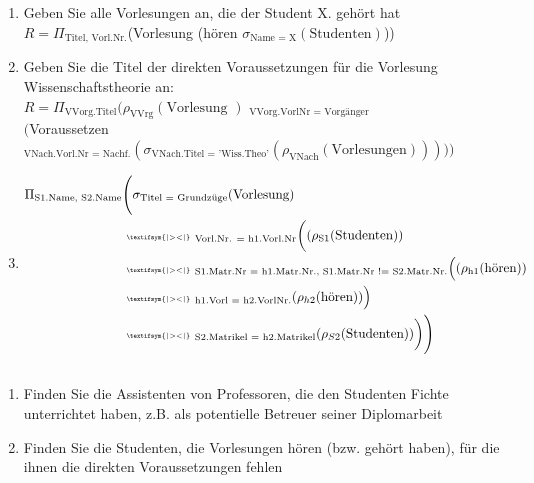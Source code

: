 \subsection{}
\begin{enumerate}
	\item Geben Sie alle Vorlesungen an, die der Student X. gehört hat \\
	 \(R = \Pi_{\text{Titel, Vorl.Nr.}}\)(Vorlesung {\tiny \textifsym{|><|}} (hören {\tiny \textifsym{|><|}} \(\sigma_{\text{Name = X}}(\text{Studenten})\)))
	 \item Geben Sie die Titel der direkten Voraussetzungen für die Vorlesung Wissenschaftstheorie an:\\
	 \(R = \Pi_{\text{VVorg.Titel}}(\rho_{\text{VVrg}}(\text{Vorlesung })\){\tiny \textifsym{|><|}} \(_{\text{VVorg.VorlNr = Vorgänger}}\) \\ \((\)Voraussetzen {\tiny \textifsym{|><|}}  \(_{\text{VNach.Vorl.Nr = Nachf.}}(\sigma_{\text{VNach.Titel = 'Wiss.Theo'}}(\rho_{\text{VNach}}(\text{Vorlesungen})))))\)
	 \item 
	 \begin{align*}
	 		\Pi_{\text{S1.Name, S2.Name}}&\Biggl(\sigma_{\text{Titel = Grundzüge}}(\text{Vorlesung})\\
	 		&\text{ {\tiny \textifsym{|><|}} }_{\text{Vorl.Nr. = h1.Vorl.Nr}}\biggl((\rho_{\text{S1}}(\text{Studenten}))\\
	 		&\text{ {\tiny \textifsym{|><|}} }_{\text{S1.Matr.Nr = h1.Matr.Nr., S1.Matr.Nr != S2.Matr.Nr.}}\Big((\rho_{\text{h1}}(\text{hören}))\\
	 		&\text{ {\tiny \textifsym{|><|}} }_{\text{h1.Vorl = h2.VorlNr.}}(\rho_{h2}(\text{hören}))\Big)\\
	 		&\text{ {\tiny \textifsym{|><|}} }_{\text{S2.Matrikel = h2.Matrikel}} (\rho_{S2}(\text{Studenten}))\biggr)\Biggr)
	 \end{align*}
\end{enumerate}
\subsection{}
\begin{enumerate}
	\item Finden Sie die Assistenten von Professoren, die den Studenten Fichte unterrichtet haben, z.B. als potentielle Betreuer seiner Diplomarbeit
	\item Finden Sie die Studenten, die Vorlesungen hören (bzw. gehört haben), für die ihnen die direkten Voraussetzungen fehlen
\end{enumerate}
